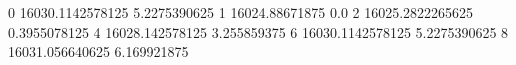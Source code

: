 0 16030.1142578125 5.2275390625
1 16024.88671875 0.0
2 16025.2822265625 0.3955078125
4 16028.142578125 3.255859375
6 16030.1142578125 5.2275390625
8 16031.056640625 6.169921875
